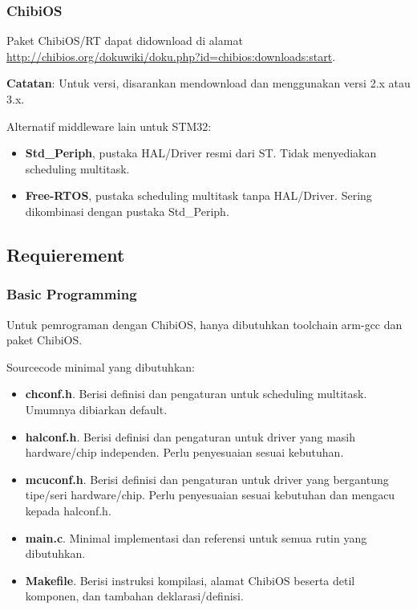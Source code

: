 \documentclass[table,dvipsnames]{beamer}
\begin{document}
	\begin{frame}
		\frametitle{ChibiOS}
		\begin{exampleblock}{}
			Paket ChibiOS/RT dapat didownload di alamat\\
			\url{http://chibios.org/dokuwiki/doku.php?id=chibios:downloads:start}.
		\end{exampleblock}

		\begin{exampleblock}{}
			\textbf{Catatan}: Untuk versi, disarankan mendownload dan menggunakan versi 2.x atau 3.x.
		\end{exampleblock}

		\begin{exampleblock}{}
			Alternatif middleware lain untuk STM32:
			\begin{itemize}
				\item \textbf{Std\_Periph}, pustaka HAL/Driver resmi dari ST. Tidak menyediakan scheduling multitask.
				\item \textbf{Free-RTOS}, pustaka scheduling multitask tanpa HAL/Driver. Sering dikombinasi dengan pustaka Std\_Periph.
			\end{itemize}
		\end{exampleblock}
	\end{frame}

	\subsection{Requierement}
	\begin{frame}
		\frametitle{Basic Programming}
		\begin{exampleblock}{}
			Untuk pemrograman dengan ChibiOS, hanya dibutuhkan toolchain arm-gcc dan paket ChibiOS.
		\end{exampleblock}

		\begin{exampleblock}{}
			Sourcecode minimal yang dibutuhkan:
			\begin{itemize}
				\item \textbf{chconf.h}. Berisi definisi dan pengaturan untuk scheduling multitask.
				Umumnya dibiarkan default.
				\item \textbf{halconf.h}. Berisi definisi dan pengaturan untuk driver yang masih hardware/chip independen.
				Perlu penyesuaian sesuai kebutuhan.
				\item \textbf{mcuconf.h}. Berisi definisi dan pengaturan untuk driver yang bergantung tipe/seri hardware/chip.
				Perlu penyesuaian sesuai kebutuhan dan mengacu kepada halconf.h.
				\item \textbf{main.c}. Minimal implementasi dan referensi untuk semua rutin yang dibutuhkan.
				\item \textbf{Makefile}. Berisi instruksi kompilasi, alamat ChibiOS beserta detil komponen, dan tambahan deklarasi/definisi.
			\end{itemize}
		\end{exampleblock}
	\end{frame}
\end{document}
